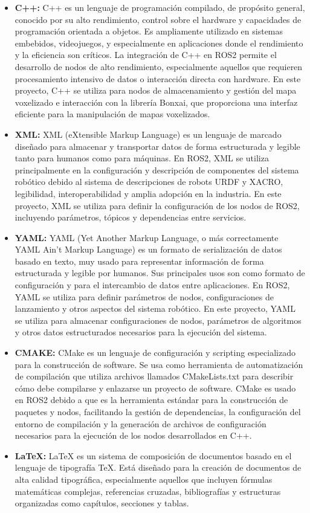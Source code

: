 \documentclass[12pt, a4paper, twoside]{article}
\begin{document}
\begin{itemize}
\begin{minipage}[r]{0.28\textwidth}
  \end{minipage}
  \item \textbf{C++:} C++ es un lenguaje de programación compilado, de propósito general, conocido por su alto rendimiento, 
  control sobre el hardware y capacidades de programación orientada a objetos. Es ampliamente utilizado en sistemas embebidos, 
  videojuegos, y especialmente en aplicaciones donde el rendimiento y la eficiencia son críticos. La integración de C++
  en ROS2 permite el desarrollo de nodos de alto rendimiento, especialmente aquellos que requieren procesamiento intensivo
  de datos o interacción directa con hardware. En este proyecto, C++ se utiliza para nodos de almacenamiento y gestión del
  mapa voxelizado e interacción con la librería Bonxai, que proporciona una interfaz eficiente para la manipulación de mapas
  voxelizados.
  \item \textbf{XML:} XML (eXtensible Markup Language) es un lenguaje de marcado diseñado para almacenar y 
  transportar datos de forma estructurada y legible tanto para humanos como para máquinas. En ROS2, XML se utiliza principalmente 
  en la configuración y descripción de componentes del sistema robótico debido al sistema de descripciones de robots URDF y 
  XACRO, legibilidad, interoperabilidad y amplia adopción en la industria. En este proyecto, XML se utiliza para
  definir la configuración de los nodos de ROS2, incluyendo parámetros, tópicos y dependencias entre servicios.
  \item \textbf{YAML:} YAML (Yet Another Markup Language, o más correctamente YAML Ain't Markup Language) es un formato de 
  serialización de datos basado en texto, muy usado para representar información de forma estructurada y legible por humanos.
  Sus principales usos son como formato de configuración y para el intercambio de datos entre aplicaciones. En ROS2, YAML se 
  utiliza para definir parámetros de nodos, configuraciones de lanzamiento y otros aspectos del sistema robótico. En este proyecto, 
  YAML se utiliza para almacenar configuraciones de nodos, parámetros de algoritmos y otros datos estructurados necesarios para 
  la ejecución del sistema.
  \item \textbf{CMAKE:} CMake es un lenguaje de configuración y scripting especializado para la construcción de software.
  Se usa como herramienta de automatización de compilación que utiliza archivos llamados CMakeLists.txt para describir 
  cómo debe compilarse y enlazarse un proyecto de software. CMake es usado en ROS2 debido a que es la herramienta 
  estándar para la construcción de paquetes y nodos, facilitando la gestión de dependencias, la configuración del entorno
  de compilación y la generación de archivos de configuración necesarios para la ejecución de los nodos desarrollados en C++.
  \item \textbf{LaTeX:} LaTeX es un sistema de composición de documentos basado en el lenguaje de tipografía TeX. Está 
  diseñado para la creación de documentos de alta calidad tipográfica, especialmente aquellos que incluyen fórmulas matemáticas 
  complejas, referencias cruzadas, bibliografías y estructuras organizadas como capítulos, secciones y tablas.
\end{itemize}
\end{document}

